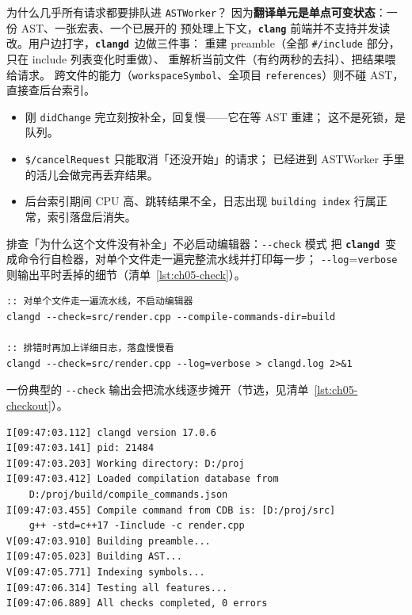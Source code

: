 \documentclass[12pt,a4paper,fontset=fandol]{ctexbook}
\newcommand{\Opt}[1]{\texttt{-\/-#1}}
\newcommand{\Bk}{\discretionary{}{}{}}
\newcommand{\Lib}[1]{\textbf{\texttt{#1}}}
\newcommand{\CD}{\Lib{clangd}}
\begin{document}
为什么几乎所有请求都要排队进 \texttt{ASTWorker}？
因为\textbf{翻译单元是单点可变状态}：一份 AST、一张宏表、一个已展开的
预处理上下文，\Lib{clang} 前端并不支持并发读改。用户边打字，\CD\ 边做三件事：
重建 preamble（全部 \texttt{\#/include} 部分，只在 include 列表变化时重做）、
重解析当前文件（有约两秒的去抖）、把结果喂给请求。
跨文件的能力（\texttt{workspaceSymbol}、全项目 \texttt{references}）则不碰 AST，
直接查后台索引。

\begin{guideline}[title={请求排队带来的三个可观察现象}]
\begin{itemize}
  \item 刚 \texttt{didChange} 完立刻按补全，回复慢——它在等 AST 重建；
        这不是死锁，是队列。
  \item \texttt{\$/cancelRequest}\Bk{} 只能取消「还没开始」的请求；
        已经进到 ASTWorker 手里的活儿会做完再丢弃结果。
  \item 后台索引期间 CPU 高、跳转结果不全，日志出现
        \texttt{building index} 行属正常，索引落盘后消失。
\end{itemize}
\end{guideline}

排查「为什么这个文件没有补全」不必启动编辑器：\Opt{check} 模式
把 \CD\ 变成命令行自检器，对单个文件走一遍完整流水线并打印每一步；
\Opt{log}=\texttt{verbose} 则输出平时丢掉的细节（清单~\ref{lst:ch05-check}）。

\begin{lstlisting}[style=shellstyle,caption={用命令行触发一次完整自检},label={lst:ch05-check}]
:: 对单个文件走一遍流水线，不启动编辑器
clangd --check=src/render.cpp --compile-commands-dir=build

:: 排错时再加上详细日志，落盘慢慢看
clangd --check=src/render.cpp --log=verbose > clangd.log 2>&1
\end{lstlisting}

一份典型的 \Opt{check} 输出会把流水线逐步摊开（节选，见清单~\ref{lst:ch05-checkout}）。

\begin{lstlisting}[style=shellstyle,caption={check 与 verbose 的真实输出节选},label={lst:ch05-checkout}]
I[09:47:03.112] clangd version 17.0.6
I[09:47:03.141] pid: 21484
I[09:47:03.203] Working directory: D:/proj
I[09:47:03.412] Loaded compilation database from
    D:/proj/build/compile_commands.json
I[09:47:03.455] Compile command from CDB is: [D:/proj/src]
    g++ -std=c++17 -Iinclude -c render.cpp
V[09:47:03.910] Building preamble...
I[09:47:05.023] Building AST...
V[09:47:05.771] Indexing symbols...
I[09:47:06.314] Testing all features...
I[09:47:06.889] All checks completed, 0 errors
\end{lstlisting}
\end{document}
